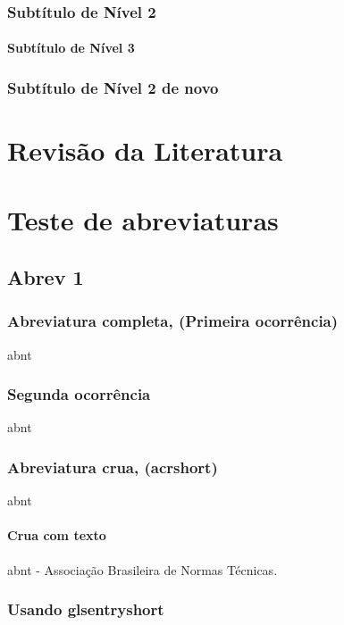 \documentclass[12pt,a4paper,oneside,brazil]{abntex2}
\begin{document}
\subsection{Subtítulo de Nível 2}
\lipsum[4]
\subsubsection{Subtítulo de Nível 3}
\lipsum[5]
\lipsum[5]

\subsection{Subtítulo de Nível 2 de novo}

\chapter{Revisão da Literatura}
\lipsum[6-7]

\chapter{Teste de abreviaturas}
\section{Abrev 1}
\subsection{Abreviatura completa, (Primeira ocorrência)}
\gls{abnt}
\subsection{Segunda ocorrência}
\gls{abnt}
\subsection{Abreviatura crua, (acrshort)}
\acrshort{abnt}
\subsubsection{Crua com texto}
\acrshort{abnt} - Associação Brasileira de Normas Técnicas.
\subsection{Usando glsentryshort}
\end{document}
